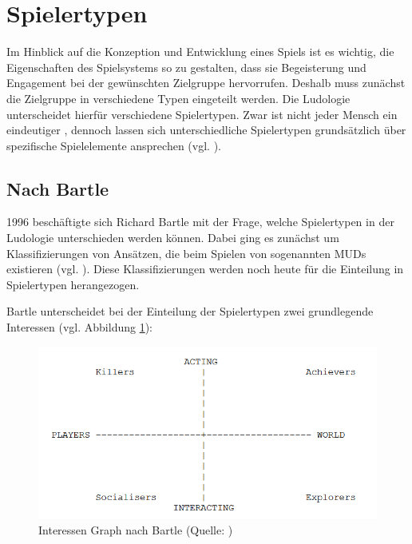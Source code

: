 
\section{Spielertypen}

Im Hinblick auf die Konzeption und Entwicklung eines Spiels ist es wichtig, die Eigenschaften des Spielsystems so zu gestalten, dass sie Begeisterung und Engagement bei der gewünschten Zielgruppe hervorrufen. Deshalb muss zunächst die Zielgruppe in verschiedene Typen eingeteilt werden. Die Ludologie unterscheidet hierfür verschiedene Spielertypen. Zwar ist nicht jeder Mensch ein eindeutiger , dennoch lassen sich unterschiedliche Spielertypen grundsätzlich über spezifische Spielelemente ansprechen (vgl. \citealp{institut_fur_ludologie_spielertypen_nodate}).

\subsection{Nach Bartle}
1996 beschäftigte sich Richard Bartle mit der Frage, welche Spielertypen in der Ludologie unterschieden werden können. Dabei ging es zunächst um Klassifizierungen von Ansätzen, die beim Spielen von sogenannten \ac{MUD}s existieren (vgl. \cite{bartle_hearts_1996}). Diese Klassifizierungen werden noch heute für die Einteilung in Spielertypen herangezogen.

Bartle unterscheidet bei der Einteilung der Spielertypen zwei grundlegende Interessen (vgl. Abbildung \ref{fig:bartle-muds}):

\begin{figure}[ht]
\centering
\includegraphics[width=1\linewidth]{content/pictures/basic_interests.PNG}
\caption{Interessen Graph nach Bartle (Quelle: \citealp{bartle_hearts_1996})}
\label{fig:bartle-muds}
\end{figure}


